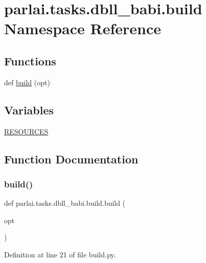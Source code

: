 \hypertarget{namespaceparlai_1_1tasks_1_1dbll__babi_1_1build}{}\section{parlai.\+tasks.\+dbll\+\_\+babi.\+build Namespace Reference}
\label{namespaceparlai_1_1tasks_1_1dbll__babi_1_1build}
\subsection*{Functions}
\begin{DoxyCompactItemize}
\item 
def \hyperlink{namespaceparlai_1_1tasks_1_1dbll__babi_1_1build_a40dc7acf84e5e6146717376b2411d42e}{build} (opt)
\end{DoxyCompactItemize}
\subsection*{Variables}
\begin{DoxyCompactItemize}
\item 
\hyperlink{namespaceparlai_1_1tasks_1_1dbll__babi_1_1build_a005b71281b53af40ed3ff6336d4d05b0}{R\+E\+S\+O\+U\+R\+C\+ES}
\end{DoxyCompactItemize}


\subsection{Function Documentation}
\mbox{\label{namespaceparlai_1_1tasks_1_1dbll__babi_1_1build_a40dc7acf84e5e6146717376b2411d42e}} 
\subsubsection{\texorpdfstring{build()}{build()}}
{\footnotesize\ttfamily def parlai.\+tasks.\+dbll\+\_\+babi.\+build.\+build (\begin{DoxyParamCaption}\item[{}]{opt }\end{DoxyParamCaption})}



Definition at line 21 of file build.\+py.



